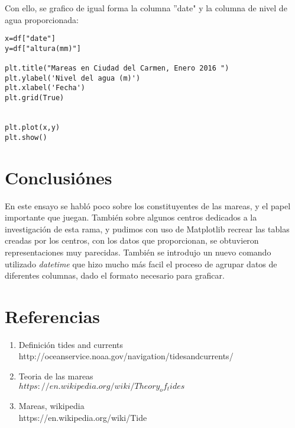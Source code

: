 \documentclass[12pt]{article}
\begin{document}
Con ello, se grafico de igual forma la columna ''date" y la columna de nivel de agua proporcionada:
\begin{verbatim}
x=df["date"]
y=df["altura(mm)"]

plt.title("Mareas en Ciudad del Carmen, Enero 2016 ")
plt.ylabel('Nivel del agua (m)')
plt.xlabel('Fecha')
plt.grid(True)


plt.plot(x,y)
plt.show()
\end{verbatim}
\section{Conclusiónes}
En este ensayo se habló poco sobre los constituyentes de las mareas, y el papel importante que juegan. También sobre algunos centros dedicados a la investigación de esta rama, y pudimos con uso de Matplotlib recrear las tablas creadas por los centros, con los datos que proporcionan, se obtuvieron representaciones muy parecidas. También se introdujo un nuevo comando utilizado \textit{datetime} que hizo mucho más facil el proceso de agrupar datos de diferentes columnas, dado el formato necesario para graficar. 
\pagebreak
\section{Referencias}
\begin{enumerate}
\item Definición tides and currents \\
http://oceanservice.noaa.gov/navigation/tidesandcurrents/
\item Teoria de las mareas \\
$https://en.wikipedia.org/wiki/Theory_of_tides$
\item Mareas, wikipedia \\
https://en.wikipedia.org/wiki/Tide
\end{enumerate}
\end{document}
